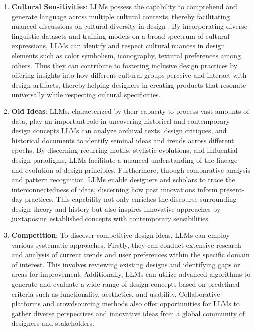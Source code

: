 \documentclass{article}
\begin{document}
\begin{enumerate}
    \item \textbf{Cultural Sensitivities}: LLMs possess the capability to comprehend and generate language across multiple cultural contexts, thereby facilitating nuanced discussions on cultural diversity in design \cite{adilazuarda2024towards}. By incorporating diverse linguistic datasets and training models on a broad spectrum of cultural expressions, LLMs can identify and respect cultural nuances in design elements such as color symbolism, iconography, textural preferences among others. Thus they can contribute to fostering inclusive design practices by offering insights into how different cultural groups perceive and interact with design artifacts, thereby helping designers in creating products that resonate universally while respecting cultural specificities.
    \item \textbf{Old Ideas}: LLMs, characterized by their capacity to process vast amounts of data, play an important role in uncovering historical and contemporary design concepts.LLMs can analyze \cite{tai2024examination} archival texts, design critiques, and historical documents to identify seminal ideas and trends across different epochs. By discerning recurring motifs, stylistic evolutions, and influential design paradigms, LLMs facilitate a nuanced understanding of the lineage and evolution of design principles. Furthermore, through comparative analysis and pattern recognition, LLMs enable designers and scholars to trace the interconnectedness of ideas, discerning how past innovations inform present-day practices. This capability not only enriches the discourse surrounding design theory and history but also inspires innovative approaches by juxtaposing established concepts with contemporary sensibilities. 
    \item \textbf{Competition}: To discover competitive design ideas, LLMs can employ various systematic approaches. Firstly, they can conduct extensive research and analysis of current trends and user preferences within the specific domain of interest. This involves reviewing existing designs and identifying gaps or areas for improvement. Additionally, LLMs can utilize advanced algorithms to generate and evaluate a wide range of design concepts \cite{ccelen2024design} based on predefined criteria such as functionality, aesthetics, and usability. Collaborative platforms and crowdsourcing methods also offer opportunities for LLMs to gather diverse perspectives and innovative ideas from a global community of designers and stakeholders. 
\end{enumerate}
\end{document}
